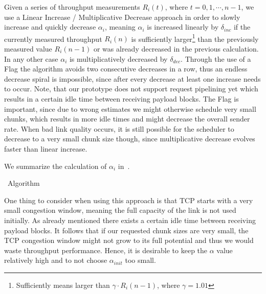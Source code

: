 Given a series of throughput measurements $R_i(t)$, where $t=0,1,\cdots,n-1$, 
we use a Linear Increase / Multiplicative Decrease approach in order to slowly increase and quickly decrease $\alpha_i$, meaning 
$\alpha_i$ is increased linearly by $\delta_{inc}$ if the currently measured throughput $R_{i}(n)$ is sufficiently larger\footnote{Sufficiently means larger than $\gamma \cdot R_{i}(n-1)$, where $\gamma=1.01$} than the previously measured value $R_{i}(n-1)$ or was already decreased in the previous calculation. 
In any other case $\alpha_i$ is multiplicatively decreased by $\delta_{dec}$. 
Through the use of a  Flag the algorithm avoids two consecutive decreases in a row, thus an endless decrease spiral is impossible, since after every decrease at least one increase needs to occur. 
Note, that our prototype does not support request pipelining yet which results in a certain idle time between receiving payload blocks.
The  Flag is important, since due to wrong estimates we might otherwise schedule very small chunks, which results in more idle times and might decrease the overall sender rate. 
When bad link quality occurs, it is still possible for the scheduler to decrease to a very small chunk size though, since multiplicative decrease evolves faster than linear increase.

We summarize the calculation of $\alpha_i$ in~.

\begin{algorithm}
\caption{\algalpha~Algorithm}
\label{alg:dynamic-alpha}
\begin{algorithmic}
\ELSE
	\ELSE
	\ENDIF
\ENDIF
\end{algorithmic}
\end{algorithm}

One thing to consider when using this approach is that TCP starts with a very small congestion window, meaning the full capacity of the link is not used initially. 
As already mentioned there exists a certain idle time between receiving payload blocks. 
It follows that if our requested chunk sizes are very small, the TCP congestion window might not grow to its full potential and thus we would waste throughput performance. 
Hence, it is desirable to keep the $\alpha$ value relatively high and to not choose $\alpha_{init}$ too small.

